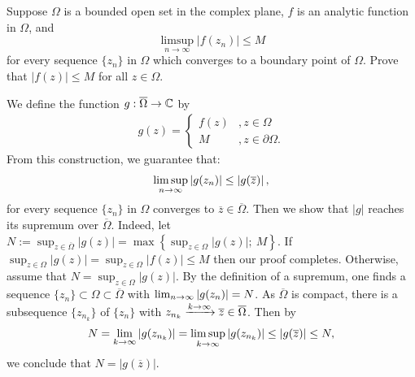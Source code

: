 \begin{problem}
Suppose $\Omega$ is a bounded open set in the complex plane, $f$ is an analytic function in $\Omega$, and
$$ \limsup_{n \to \infty} |f(z_n)| \leq M $$
for every sequence $\{z_n\}$ in $\Omega$ which converges to a boundary point of $\Omega$. Prove that $|f(z)| \leq M$ for all $z \in \Omega$.
\begin{solution}
We define the function $g:\overline{\Omega} \rightarrow \mathbb{C}$ by
\begin{align*}
    g(z) = \begin{cases}
    f(z) &, z\in \Omega \\
    M &, z\in \partial \Omega.
    \end{cases}
\end{align*}
From this construction, we guarantee that:
\begin{align*}
    \limsup\limits_{n\rightarrow \infty} |g(z_n)| \le \left|g(\overline{z})\right|,
\end{align*}
for every sequence $\{z_n\}$ in $\Omega$ converges to $\overline{z} \in \overline{\Omega}$. Then we show that $|g|$ reaches its supremum over $\overline{\Omega}$. Indeed, let $N:= \sup_{z\in \overline{\Omega}} |g(z)| = \max \left\{\sup_{z\in \Omega} |g(z)|;\ M\right\}$. If $\sup_{z\in \Omega} |g(z)| = \sup_{z\in \Omega}|f(z)| \le M$ then our proof completes. Otherwise, assume that $N= \sup_{z\in \Omega}|g(z)|$. By the definition of a supremum, one finds a sequence $\{z_n\} \subset \Omega \subset \overline{\Omega}$ with $\lim_{n\rightarrow \infty} |g(z_n)| = N$. As $\overline{\Omega}$ is compact, there is a subsequence $\{z_{n_k}\}$ of $\{z_n\}$ with $z_{n_k} \xrightarrow{k \rightarrow \infty} \overline{z} \in \overline{\Omega}$. Then by
\begin{align*}
    N = \lim_{k\rightarrow\infty} \left|g(z_{n_k})\right| = \limsup_{k\rightarrow\infty} \left|g(z_{n_k})\right| \le \left| g(\overline{z})\right| \le N,
\end{align*}
we conclude that $N= \left|g(\overline{z})
\right|$. \\


\end{solution}
\end{problem}
